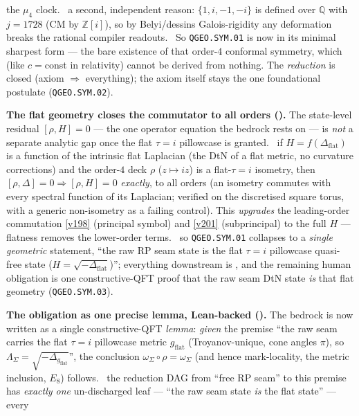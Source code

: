 \documentclass[11pt,a4paper]{article}
\newcommand{\Z}{\mathbb Z}
\begin{document}
\begin{keybox}
the $\mu_4$ clock. \mC\ a second, independent reason: $\{1,i,-1,-i\}$ is defined over $\mathbb Q$ with $j{=}1728$
(CM by $\Z[i]$), so by Belyi/dessins Galois-rigidity any deformation breaks the rational compiler readouts.
\mO\ So \texttt{QGEO.SYM.01} is now in its minimal sharpest form --- the bare existence of that order-$4$
conformal symmetry, which (like $c{=}$const in relativity) cannot be derived from nothing. The \emph{reduction}
is closed (axiom $\Rightarrow$ everything); the axiom itself stays the one foundational postulate (\texttt{QGEO.SYM.02}).
\par\smallskip\noindent\textbf{The flat geometry closes the commutator to all orders ().}
The state-level residual $[\rho,H]{=}0$ --- the one operator equation the bedrock rests on --- is \emph{not} a
separate analytic gap once the flat $\tau{=}i$ pillowcase is granted. \mE\ if $H=f(\Delta_{\mathrm{flat}})$ is a
function of the intrinsic flat Laplacian (the DtN of a flat metric, no curvature corrections) and the order-$4$
deck $\rho$ ($z\mapsto iz$) is a flat-$\tau{=}i$ isometry, then $[\rho,\Delta]{=}0\Rightarrow[\rho,H]{=}0$
\emph{exactly}, to all orders (an isometry commutes with every spectral function of its Laplacian; verified on
the discretised square torus, with a generic non-isometry as a failing control). This \emph{upgrades} the
leading-order commutation \vref{v198} (principal symbol) and \vref{v201} (subprincipal) to the full $H$ ---
flatness removes the lower-order terms. \mO\ so \texttt{QGEO.SYM.01} collapses to a \emph{single geometric}
statement, ``the raw RP seam state is the flat $\tau{=}i$ pillowcase quasi-free state ($H{=}\sqrt{-\Delta_{\mathrm{flat}}}$)'';
everything downstream is \mE, and the remaining human obligation is one constructive-QFT proof that the raw seam
DtN state \emph{is} that flat geometry (\texttt{QGEO.SYM.03}).
\par\smallskip\noindent\textbf{The obligation as one precise lemma, Lean-backed ().}
The bedrock is now written as a single constructive-QFT \emph{lemma}: \emph{given} the premise ``the raw seam
carries the flat $\tau{=}i$ pillowcase metric $g_{\mathrm{flat}}$ (Troyanov-unique, cone angles $\pi$), so
$\Lambda_\Sigma=\sqrt{-\Delta_{g_{\mathrm{flat}}}}$'', the conclusion $\omega_\Sigma\circ\rho=\omega_\Sigma$ (and
hence mark-locality, the metric inclusion, $E_8$) follows. \mE\ the reduction DAG from ``free RP seam'' to this
premise has \emph{exactly one} un-discharged leaf --- ``the raw seam state \emph{is} the flat state'' --- every

\end{keybox}
\end{document}
